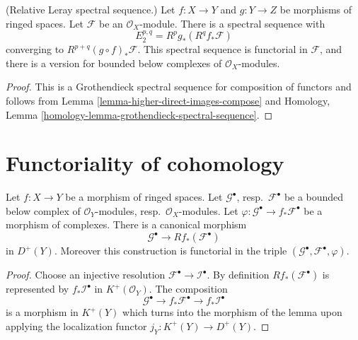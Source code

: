 \begin{lemma}
\label{lemma-relative-Leray}
(Relative Leray spectral sequence.)
Let $f : X \to Y$ and $g : Y \to Z$ be morphisms of ringed spaces.
Let $\mathcal{F}$ be an $\mathcal{O}_X$-module.
There is a spectral sequence with
$$
E_2^{p, q} = R^pg_*(R^qf_*\mathcal{F})
$$
converging to $R^{p + q}(g \circ f)_*\mathcal{F}$.
This spectral sequence is functorial in $\mathcal{F}$, and there
is a version for bounded below complexes of $\mathcal{O}_X$-modules.
\end{lemma}

\begin{proof}
This is a Grothendieck spectral sequence for composition of functors
and follows from Lemma \ref{lemma-higher-direct-images-compose} and
Homology, Lemma \ref{homology-lemma-grothendieck-spectral-sequence}.
\end{proof}














\section{Functoriality of cohomology}
\label{section-functoriality}

\begin{lemma}
\label{lemma-functoriality}
Let $f : X \to Y$ be a morphism of ringed spaces.
Let $\mathcal{G}^\bullet$, resp.\ $\mathcal{F}^\bullet$ be
a bounded below complex of $\mathcal{O}_Y$-modules,
resp.\ $\mathcal{O}_X$-modules. Let
$\varphi : \mathcal{G}^\bullet \to f_*\mathcal{F}^\bullet$
be a morphism of complexes. There is a canonical morphism
$$
\mathcal{G}^\bullet
\longrightarrow
Rf_*(\mathcal{F}^\bullet)
$$
in $D^{+}(Y)$. Moreover this construction is functorial in the triple
$(\mathcal{G}^\bullet, \mathcal{F}^\bullet, \varphi)$.
\end{lemma}

\begin{proof}
Choose an injective resolution $\mathcal{F}^\bullet \to \mathcal{I}^\bullet$.
By definition $Rf_*(\mathcal{F}^\bullet)$ is represented by
$f_*\mathcal{I}^\bullet$ in $K^{+}(\mathcal{O}_Y)$.
The composition
$$
\mathcal{G}^\bullet \to f_*\mathcal{F}^\bullet \to f_*\mathcal{I}^\bullet
$$
is a morphism in $K^{+}(Y)$ which turns
into the morphism of the lemma upon applying the
localization functor $j_Y : K^{+}(Y) \to D^{+}(Y)$.
\end{proof}

